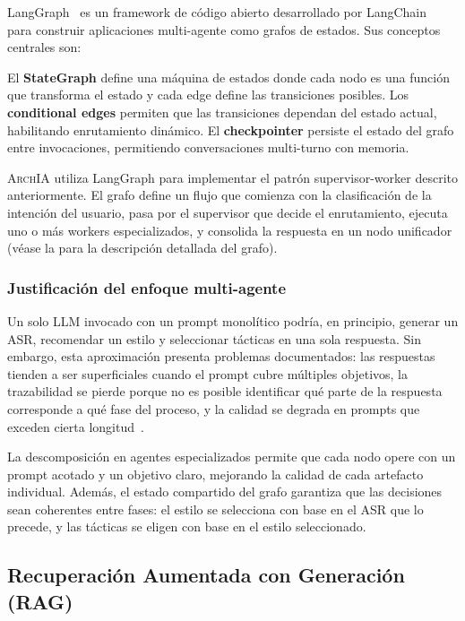 \documentclass[12pt, letterpaper, oneside]{article}
\newcommand{\archia}{\textsc{ArchIA}}
\begin{document}
LangGraph~\cite{langgraph2024} es un framework de código abierto desarrollado
por LangChain~\cite{langchain2024} para construir aplicaciones multi-agente
como grafos de estados. Sus conceptos centrales son:

El \textbf{StateGraph} define una máquina de estados donde cada nodo es una
función que transforma el estado y cada edge define las transiciones posibles.
Los \textbf{conditional edges} permiten que las transiciones dependan del estado
actual, habilitando enrutamiento dinámico. El \textbf{checkpointer} persiste el
estado del grafo entre invocaciones, permitiendo conversaciones multi-turno con
memoria.

\archia{} utiliza LangGraph para implementar el patrón supervisor-worker descrito
anteriormente. El grafo define un flujo que comienza con la clasificación de la
intención del usuario, pasa por el supervisor que decide el enrutamiento, ejecuta
uno o más workers especializados, y consolida la respuesta en un nodo unificador
(véase la  para la descripción detallada del grafo).

\subsubsection{Justificación del enfoque multi-agente}

Un solo LLM invocado con un prompt monolítico podría, en principio, generar un
ASR, recomendar un estilo y seleccionar tácticas en una sola respuesta. Sin
embargo, esta aproximación presenta problemas documentados: las respuestas tienden
a ser superficiales cuando el prompt cubre múltiples objetivos, la trazabilidad
se pierde porque no es posible identificar qué parte de la respuesta corresponde
a qué fase del proceso, y la calidad se degrada en prompts que exceden cierta
longitud~\cite{zhao2023survey}.

La descomposición en agentes especializados permite que cada nodo opere con un
prompt acotado y un objetivo claro, mejorando la calidad de cada artefacto
individual. Además, el estado compartido del grafo garantiza que las decisiones
sean coherentes entre fases: el estilo se selecciona con base en el ASR que lo
precede, y las tácticas se eligen con base en el estilo seleccionado.


\subsection{Recuperación Aumentada con Generación (RAG)}
\label{subsec:rag}
\end{document}
